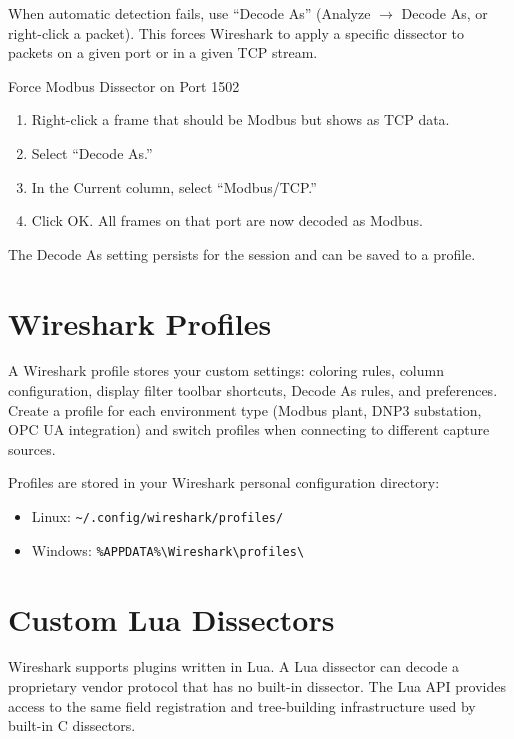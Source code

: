 \documentclass[12pt,twoside,openright]{memoir}
\begin{document}
When automatic detection fails, use ``Decode As'' (Analyze $\to$ Decode As, or right-click a packet). This forces Wireshark to apply a specific dissector to packets on a given port or in a given TCP stream.

\begin{example}{Force Modbus Dissector on Port 1502}
\begin{enumerate}[noitemsep]
  \item Right-click a frame that should be Modbus but shows as TCP data.
  \item Select ``Decode As.''
  \item In the Current column, select ``Modbus/TCP.''
  \item Click OK. All frames on that port are now decoded as Modbus.
\end{enumerate}
The Decode As setting persists for the session and can be saved to a profile.
\end{example}

\section{Wireshark Profiles}

A Wireshark profile stores your custom settings: coloring rules, column configuration, display filter toolbar shortcuts, Decode As rules, and preferences. Create a profile for each environment type (Modbus plant, DNP3 substation, OPC UA integration) and switch profiles when connecting to different capture sources.

Profiles are stored in your Wireshark personal configuration directory:
\begin{itemize}[noitemsep]
  \item Linux: \texttt{\textasciitilde/.config/wireshark/profiles/}
  \item Windows: \texttt{\%APPDATA\%\textbackslash Wireshark\textbackslash profiles\textbackslash}
\end{itemize}

\section{Custom Lua Dissectors}

Wireshark supports plugins written in Lua. A Lua dissector can decode a proprietary vendor protocol that has no built-in dissector. The Lua API provides access to the same field registration and tree-building infrastructure used by built-in C dissectors.
\end{document}

